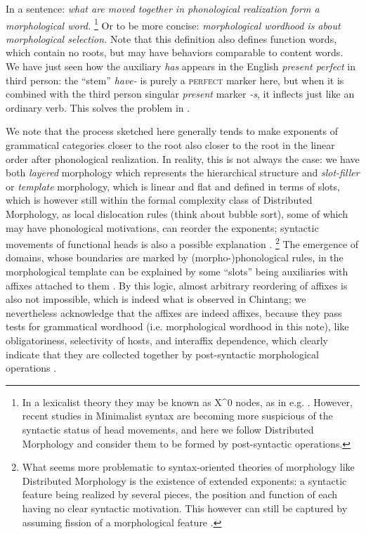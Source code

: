 \documentclass[a4paper, oneside, scheme=plain, 12pt]{article}
\newcommand{\form}[1]{\emph{#1}}
\newcommand*{\category}[1]{\textsc{#1}}
\begin{document}
In a sentence: \form{what are moved together in phonological realization form a morphological word.}%
\footnote{
    In a lexicalist theory they may be known as X^0 nodes, as in e.g. \citet{bickel2007free}.
    However, recent studies in Minimalist syntax are becoming more suspicious
    of the syntactic status of head movements,
    and here we follow Distributed Morphology and consider them to be formed by 
    post-syntactic operations.
}
Or to be more concise: \form{morphological wordhood is about morphological selection.}
Note that this definition also defines function words,
which contain no roots, but may have behaviors comparable to content words.
We have just seen how the auxiliary \form{has} appears in the English \form{present perfect} in third person:
the ``stem'' \form{have-} is purely a \category{perfect} marker here,
but when it is combined with the third person singular \form{present} marker \form{-s},
it inflects just like an ordinary verb.
This solves the problem in .

We note that the process sketched here generally tends to 
make exponents of grammatical categories closer to the root also closer to the root
in the linear order after phonological realization.
In reality, this is not always the case:
we have both \emph{layered} morphology which represents the hierarchical structure
and \emph{slot-filler} or \emph{template} morphology, which is linear and flat and defined in terms of slots,
which is however still within the formal complexity class of Distributed Morphology,
as local dislocation rules (think about bubble sort), some of which may have phonological motivations,
can reorder the exponents;
syntactic movements of functional heads is also a possible explanation
\citep{bye2020morpheme}.%
\footnote{
    What seems more problematic to syntax-oriented theories of morphology like Distributed Morphology
    is the existence of extended exponents: a syntactic feature being realized by several pieces,
    the position and function of each having no clear syntactic motivation.
    This however can still be captured by assuming fission of a morphological feature \citep{bobaljik2017distributed}.
}
The emergence of domains, whose boundaries are marked by (morpho-)phonological rules, 
in the morphological template can be explained by
some ``slots'' being auxiliaries with affixes attached to them \citep{mcdonough2008athabaskan}.
By this logic, almost arbitrary reordering of affixes is also not impossible,
which is indeed what is observed in Chintang;
we nevertheless acknowledge that the affixes are indeed affixes,
because they pass tests for grammatical wordhood (i.e. morphological wordhood in this note),
like obligatoriness, selectivity of hosts, and interaffix dependence,
which clearly indicate that they are collected together by post-syntactic morphological operations \citep{bickel2007free}.
\end{document}
